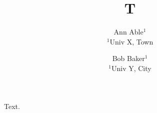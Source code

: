 \documentclass{article}
\begin{document}
\title{T}
\author{Ann Able$^{1}$ \\ $^1$Univ X, Town \and Bob Baker$^{1}$ \\ $^1$Univ Y, City}
\maketitle
Text.
\end{document}
